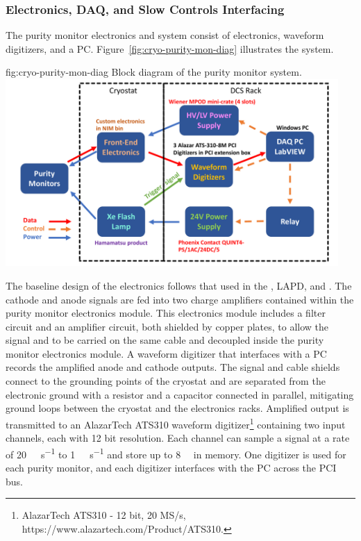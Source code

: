 \subsubsection{Electronics, DAQ, and Slow Controls Interfacing}
The purity monitor electronics and  system consist of  electronics, waveform digitizers, and a  PC.  Figure~\ref{fig:cryo-purity-mon-diag} %
illustrates the system.

\begin{dunefigure}{fig:cryo-purity-mon-diag}
  {Block diagram of the purity monitor system.}
  \includegraphics[width=0.95\textwidth]{graphics/PrMon_BlockDiagram_v2.pdf}
\end{dunefigure}


The baseline design of the  electronics follows that used in %
the , LAPD, and \microboone. The cathode and anode signals are fed into two charge amplifiers contained within the purity monitor electronics module.
This electronics module includes a  filter circuit and an amplifier circuit, both shielded by copper plates, to allow the signal and  to be carried on the same cable and decoupled inside the purity monitor electronics module. 
A waveform digitizer that interfaces with a  PC records the amplified anode and cathode outputs. 
The signal and  cable shields connect to the grounding points of the cryostat and are separated from the electronic ground with a resistor and a capacitor connected in parallel, mitigating ground loops between the cryostat and the electronics racks. Amplified output is transmitted to an AlazarTech ATS310 waveform digitizer\footnote{AlazarTech ATS310\texttrademark{} - 12 bit, 20 MS/s,  https://www.alazartech.com/Product/ATS310.} containing two input channels, each with 12 bit resolution. Each channel can sample a signal at a rate of \SI{20}{\mega\samples\per\second} to \SI{1}{\kilo\samples\per\second} and store up to \SI{8}{\mega\samples} in memory. One digitizer is used for each purity monitor, and each digitizer interfaces with the  PC across the PCI bus. 

